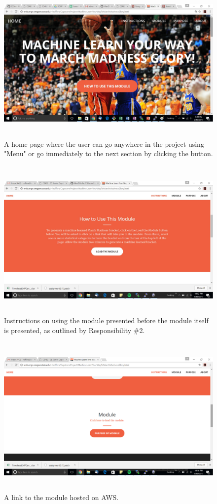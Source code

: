 \documentclass[onecolumn, draftclsnofoot,10pt, compsoc]{IEEEtran}
\begin{document}
\begin{figure}[H]
\centering
\includegraphics[width=500px, height=300px]{images/dv}
\caption{A home page where the user can go anywhere in the project using "Menu" or go immediately to the next section by clicking the button.}
\label{fig1}
\end{figure}

\begin{figure}[H]
\centering
\includegraphics[width=500px, height=300px]{images/Instructions}
\caption{Instructions on using the module presented before the module itself is presented, as outlined by Responsibility \#2.}
\label{fig2}
\end{figure}

\begin{figure}[H]
\centering
\includegraphics[width=500px, height=300px]{images/Module}
\caption{A link to the module hosted on AWS.}
\label{fig3}
\end{figure}
\end{document}
